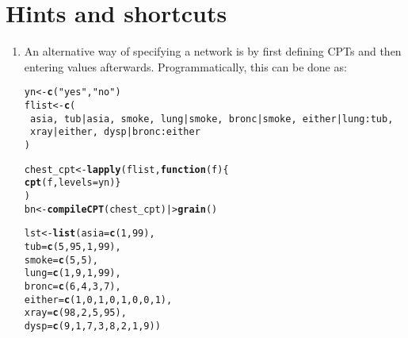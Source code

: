 \documentclass[10pt]{article}\usepackage[]{graphicx}\usepackage[]{xcolor}
\makeatletter
\newcommand{\hlnum}[1]{\textcolor[rgb]{0.686,0.059,0.569}{#1}}%
\newcommand{\hlstr}[1]{\textcolor[rgb]{0.192,0.494,0.8}{#1}}%
\newcommand{\hlopt}[1]{\textcolor[rgb]{0,0,0}{#1}}%
\newcommand{\hlstd}[1]{\textcolor[rgb]{0.345,0.345,0.345}{#1}}%
\newcommand{\hlkwa}[1]{\textcolor[rgb]{0.161,0.373,0.58}{\textbf{#1}}}%
\newcommand{\hlkwb}[1]{\textcolor[rgb]{0.69,0.353,0.396}{#1}}%
\newcommand{\hlkwc}[1]{\textcolor[rgb]{0.333,0.667,0.333}{#1}}%
\newcommand{\hlkwd}[1]{\textcolor[rgb]{0.737,0.353,0.396}{\textbf{#1}}}%
\newenvironment{kframe}{%
 \def\at@end@of@kframe{}%
 \ifinner\ifhmode%
  \def\at@end@of@kframe{\end{minipage}}%
  \begin{minipage}{\columnwidth}%
 \fi\fi%
 \def\FrameCommand##1{\hskip\@totalleftmargin \hskip-\fboxsep
 \colorbox{shadecolor}{##1}\hskip-\fboxsep
     \hskip-\linewidth \hskip-\@totalleftmargin \hskip\columnwidth}%
 \MakeFramed {\advance\hsize-\width
   \@totalleftmargin\z@ \linewidth\hsize
   \@setminipage}}%
 {\par\unskip\endMakeFramed%
 \at@end@of@kframe}
\newenvironment{knitrout}{}{} %
\makeatother
\begin{document}
\section{Hints and shortcuts}
\label{sec:small-shortcuts}

\begin{enumerate}
\item An alternative way of specifying a network is by first defining CPTs and then entering values afterwards. Programmatically, this can be done as:

\begin{knitrout}
\color{fgcolor}\begin{kframe}
\begin{alltt}
\hlstd{yn} \hlkwb{<-} \hlkwd{c}\hlstd{(}\hlstr{"yes"}\hlstd{,}\hlstr{"no"}\hlstd{)}
\hlstd{flist} \hlkwb{<-} \hlkwd{c}\hlstd{(}
    \hlopt{~}\hlstd{asia,} \hlopt{~}\hlstd{tub}\hlopt{|}\hlstd{asia,} \hlopt{~}\hlstd{smoke,} \hlopt{~}\hlstd{lung}\hlopt{|}\hlstd{smoke,} \hlopt{~}\hlstd{bronc}\hlopt{|}\hlstd{smoke,} \hlopt{~}\hlstd{either}\hlopt{|}\hlstd{lung}\hlopt{:}\hlstd{tub,}
    \hlopt{~}\hlstd{xray}\hlopt{|}\hlstd{either,} \hlopt{~}\hlstd{dysp}\hlopt{|}\hlstd{bronc}\hlopt{:}\hlstd{either}
\hlstd{)}

\hlstd{chest_cpt} \hlkwb{<-} \hlkwd{lapply}\hlstd{(flist,} \hlkwa{function}\hlstd{(}\hlkwc{f}\hlstd{)\{}
    \hlkwd{cpt}\hlstd{(f,} \hlkwc{levels}\hlstd{=yn)\}}
    \hlstd{)}
\hlstd{bn} \hlkwb{<-} \hlkwd{compileCPT}\hlstd{(chest_cpt) |>} \hlkwd{grain}\hlstd{()}

\hlstd{lst} \hlkwb{<-} \hlkwd{list}\hlstd{(}\hlkwc{asia}\hlstd{=}\hlkwd{c}\hlstd{(}\hlnum{1}\hlstd{,} \hlnum{99}\hlstd{),}
            \hlkwc{tub}\hlstd{=}\hlkwd{c}\hlstd{(}\hlnum{5}\hlstd{,} \hlnum{95}\hlstd{,} \hlnum{1}\hlstd{,} \hlnum{99}\hlstd{),}
            \hlkwc{smoke}\hlstd{=}\hlkwd{c}\hlstd{(}\hlnum{5}\hlstd{,} \hlnum{5}\hlstd{),}
            \hlkwc{lung}\hlstd{=}\hlkwd{c}\hlstd{(}\hlnum{1}\hlstd{,} \hlnum{9}\hlstd{,} \hlnum{1}\hlstd{,} \hlnum{99}\hlstd{),}
            \hlkwc{bronc}\hlstd{=}\hlkwd{c}\hlstd{(}\hlnum{6}\hlstd{,} \hlnum{4}\hlstd{,} \hlnum{3}\hlstd{,} \hlnum{7}\hlstd{),}
            \hlkwc{either}\hlstd{=}\hlkwd{c}\hlstd{(}\hlnum{1}\hlstd{,} \hlnum{0}\hlstd{,} \hlnum{1}\hlstd{,} \hlnum{0}\hlstd{,} \hlnum{1}\hlstd{,} \hlnum{0}\hlstd{,} \hlnum{0}\hlstd{,} \hlnum{1}\hlstd{),}
            \hlkwc{xray}\hlstd{=}\hlkwd{c}\hlstd{(}\hlnum{98}\hlstd{,} \hlnum{2}\hlstd{,} \hlnum{5}\hlstd{,} \hlnum{95}\hlstd{),}
            \hlkwc{dysp}\hlstd{=}\hlkwd{c}\hlstd{(}\hlnum{9}\hlstd{,} \hlnum{1}\hlstd{,} \hlnum{7}\hlstd{,} \hlnum{3}\hlstd{,} \hlnum{8}\hlstd{,} \hlnum{2}\hlstd{,} \hlnum{1}\hlstd{,} \hlnum{9}\hlstd{))}


\end{alltt}
\end{kframe}
\end{knitrout}
\end{enumerate}
\end{document}
